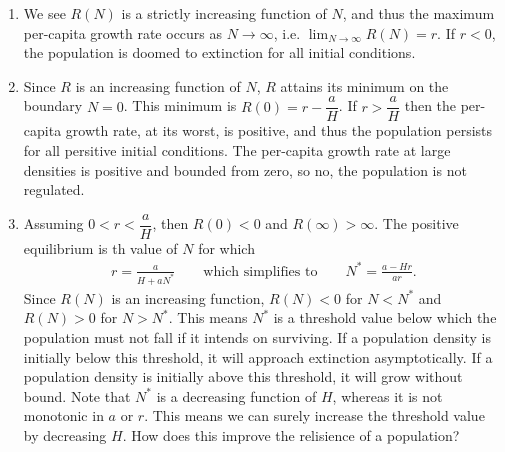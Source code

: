 \documentclass{article} %
\theoremstyle{plain}
\numberwithin{equation}{section} %
\numberwithin{figure}{section} %
\numberwithin{table}{section} %
\begin{document}
\begin{enumerate}[\ \ (a)]
    \item
        We see $R(N)$ is a strictly increasing function of $N$, and thus the maximum per-capita growth rate occurs as $N\rightarrow\infty$, i.e. $\displaystyle\lim_{N\rightarrow \infty}R(N) = r$.  If $r < 0$, the population is doomed to extinction for all initial conditions.
    \item
        Since $R$ is an increasing function of $N$, $R$ attains its minimum on the boundary $N=0$.  This minimum is $R(0) = r - \dfrac{a}{H}$.  If $r > \dfrac{a}{H}$ then the per-capita growth rate, at its worst, is positive, and thus the population persists for all persitive initial conditions.  The per-capita growth rate at large densities is positive and bounded from zero, so no, the population is not regulated.
    \item
        Assuming $0 < r < \dfrac{a}{H}$, then $R(0)<0$ and $R(\infty)>\infty$.  The positive equilibrium is th value of $N$ for which
        \begin{align*}
            r = \frac{a}{H + aN^*} \qquad \text{which simplifies to} \qquad N^* = \frac{a - Hr}{ar}.
        \end{align*}
        Since $R(N)$ is an increasing function, $R(N) < 0$ for $N < N^*$ and $R(N) > 0$ for $N > N^*$.  This means $N^*$ is a threshold value below which the population must not fall if it intends on surviving.  If a population density is initially below this threshold, it will approach extinction asymptotically.  If a population density is initially above this threshold, it will grow without bound.  Note that $N^*$ is a decreasing function of $H$, whereas it is not monotonic in $a$ or $r$.  This means we can surely increase the threshold value by decreasing $H$.  {\color{red} How does this improve the relisience of a population?}
\end{enumerate}
\end{document}
